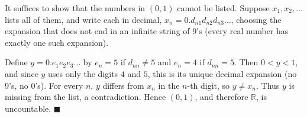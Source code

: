 It suffices to show that the numbers in $(0,1)$ cannot be listed. Suppose $x_1,x_2,\ldots$ lists all of them, and write each in decimal, $x_n=0.d_{n1}d_{n2}d_{n3}\ldots$, choosing the expansion that does not end in an infinite string of $9$'s (every real number has exactly one such expansion).

Define $y=0.e_1e_2e_3\ldots$ by $e_n=5$ if $d_{nn}\ne5$ and $e_n=4$ if $d_{nn}=5$. Then $0<y<1$, and since $y$ uses only the digits $4$ and $5$, this is its unique decimal expansion (no $9$'s, no $0$'s). For every $n$, $y$ differs from $x_n$ in the $n$-th digit, so $y\ne x_n$. Thus $y$ is missing from the list, a contradiction. Hence $(0,1)$, and therefore $\mathbb R$, is uncountable. $\blacksquare$

